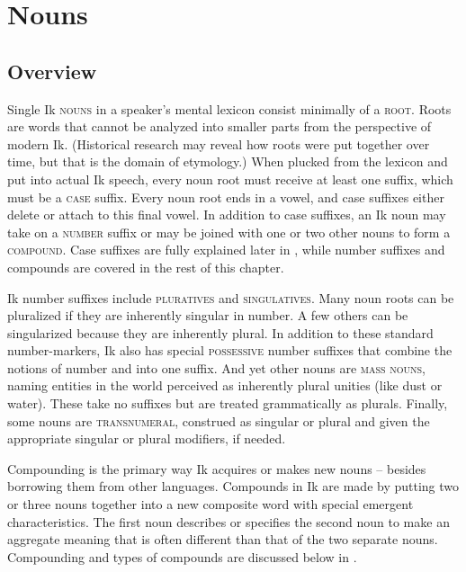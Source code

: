 \section{Nouns}\label{sec:4}



\subsection{Overview}\label{sec:4.1}


Single Ik \textsc{nouns} in a speaker’s mental lexicon consist minimally of a \textsc{root.} Roots are words that cannot be analyzed into smaller parts from the perspective of modern Ik. (Historical research may reveal how roots were put together over time, but that is the domain of etymology.) When plucked from the lexicon and put into actual Ik speech, every noun root must receive at least one suffix, which must be a \textsc{case} suffix. Every noun root ends in a vowel, and case suffixes either delete or attach to this final vowel. In addition to case suffixes, an Ik noun may take on a \textsc{number} suffix or may be joined with one or two other nouns to form a \textsc{compound}. Case suffixes are fully explained later in , while number suffixes and compounds are covered in the rest of this chapter.

Ik number suffixes include \textsc{pluratives} and \textsc{singulatives}. Many noun roots can be pluralized if they are inherently singular in number. A few others can be singularized because they are inherently plural. In addition to these standard number-markers, Ik also has special \textsc{possessive} number suffixes that combine the notions of number and  into one suffix. And yet other nouns are \textsc{mass} \textsc{nouns}, naming entities in the world perceived as inherently plural unities (like dust or water). These take no suffixes but are treated grammatically as plurals. Finally, some nouns are \textsc{transnumeral}, construed as singular or plural and given the appropriate singular or plural modifiers, if needed. 

Compounding is the primary way Ik acquires or makes new nouns – besides borrowing them from other languages. Compounds in Ik are made by putting two or three nouns together into a new composite word with special emergent characteristics. The first noun describes or specifies the second noun to make an aggregate meaning that is often different than that of the two separate nouns. Compounding and types of compounds are discussed below in .

